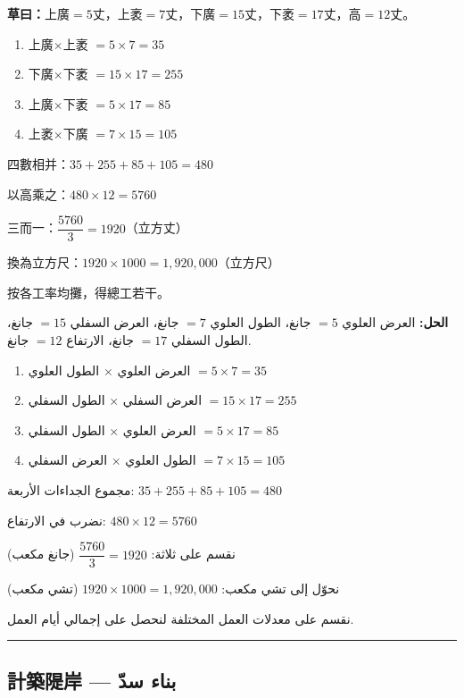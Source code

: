 \documentclass[11pt,a4paper]{article}
\newcommand{\ar}[1]{\arabicfont\beginR #1\endR}
\newcommand{\longline}{\noindent\rule{\textwidth}{0.4pt}}
\newcommand{\working}[2]{\par\noindent%
  \begin{minipage}[t]{0.48\textwidth}\textbf{草曰：}#1\end{minipage}%
  \hfill%
  \begin{minipage}[t]{0.48\textwidth}\arabicfont\beginR\textbf{الحل:} #2\endR\end{minipage}\par\vspace{0.2cm}}
\begin{document}
\working{上廣$=5$丈，上袤$=7$丈，下廣$=15$丈，下袤$=17$丈，高$=12$丈。

\begin{enumerate}
  \item 上廣$\times$上袤 $= 5 \times 7 = 35$
  \item 下廣$\times$下袤 $= 15 \times 17 = 255$
  \item 上廣$\times$下袤 $= 5 \times 17 = 85$
  \item 上袤$\times$下廣 $= 7 \times 15 = 105$
\end{enumerate}

四數相并：$35 + 255 + 85 + 105 = 480$

以高乘之：$480 \times 12 = 5760$

三而一：$\dfrac{5760}{3} = 1920$（立方丈）

換為立方尺：$1920 \times 1000 = 1{,}920{,}000$（立方尺）

按各工率均攤，得總工若干。}{العرض العلوي $= 5$ جانغ، الطول العلوي $= 7$ جانغ، العرض السفلي $= 15$ جانغ، الطول السفلي $= 17$ جانغ، الارتفاع $= 12$ جانغ.

\begin{enumerate}
  \item العرض العلوي $\times$ الطول العلوي $= 5 \times 7 = 35$
  \item العرض السفلي $\times$ الطول السفلي $= 15 \times 17 = 255$
  \item العرض العلوي $\times$ الطول السفلي $= 5 \times 17 = 85$
  \item الطول العلوي $\times$ العرض السفلي $= 7 \times 15 = 105$
\end{enumerate}

مجموع الجداءات الأربعة: $35 + 255 + 85 + 105 = 480$

نضرب في الارتفاع: $480 \times 12 = 5760$

نقسم على ثلاثة: $\dfrac{5760}{3} = 1920$ (جانغ مكعب)

نحوّل إلى تشي مكعب: $1920 \times 1000 = 1{,}920{,}000$ (تشي مكعب)

نقسم على معدلات العمل المختلفة لنحصل على إجمالي أيام العمل.}

\vspace{0.5em}
\longline

\subsection{計築隄岸 — \ar{بناء سدّ}}
\end{document}
